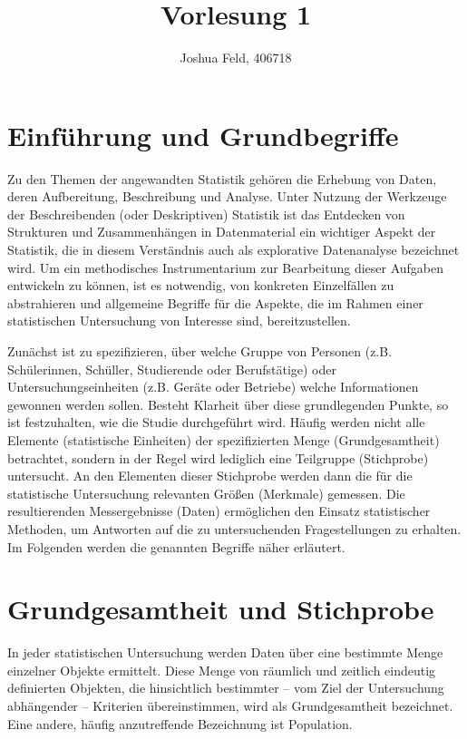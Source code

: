 \documentclass{lecture}
\institute{Institut für Statistik und Wirtschaftsmathematik}
\title{Vorlesung 1}
\author{Joshua Feld, 406718}
\begin{document}
    \maketitle


    \section*{Einführung und Grundbegriffe}

    Zu den Themen der angewandten Statistik gehören die Erhebung von Daten, deren Aufbereitung, Beschreibung und Analyse.
    Unter Nutzung der Werkzeuge der Beschreibenden (oder Deskriptiven) Statistik ist das Entdecken von Strukturen und Zusammenhängen in Datenmaterial ein wichtiger Aspekt der Statistik, die in diesem Verständnis auch als explorative Datenanalyse bezeichnet wird.
    Um ein methodisches Instrumentarium zur Bearbeitung dieser Aufgaben entwickeln zu können, ist es notwendig, von konkreten Einzelfällen zu abstrahieren und allgemeine Begriffe für die Aspekte, die im Rahmen einer statistischen Untersuchung von Interesse sind, bereitzustellen.

    Zunächst ist zu spezifizieren, über welche Gruppe von Personen (z.B. Schülerinnen, Schüller, Studierende oder Berufstätige) oder Untersuchungseinheiten (z.B. Geräte oder Betriebe) welche Informationen gewonnen werden sollen.
    Besteht Klarheit über diese grundlegenden Punkte, so ist festzuhalten, wie die Studie durchgeführt wird.
    Häufig werden nicht alle Elemente (statistische Einheiten) der spezifizierten Menge (Grundgesamtheit) betrachtet, sondern in der Regel wird lediglich eine Teilgruppe (Stichprobe) untersucht.
    An den Elementen dieser Stichprobe werden dann die für die statistische Untersuchung relevanten Größen (Merkmale) gemessen.
    Die resultierenden Messergebnisse (Daten) ermöglichen den Einsatz statistischer Methoden, um Antworten auf die zu untersuchenden Fragestellungen zu erhalten.
    Im Folgenden werden die genannten Begriffe näher erläutert.


    \section*{Grundgesamtheit und Stichprobe}

    In jeder statistischen Untersuchung werden Daten über eine bestimmte Menge einzelner Objekte ermittelt.
    Diese Menge von räumlich und zeitlich eindeutig definierten Objekten, die hinsichtlich bestimmter -- vom Ziel der Untersuchung abhängender -- Kriterien übereinstimmen, wird als Grundgesamtheit bezeichnet.
    Eine andere, häufig anzutreffende Bezeichnung ist Population.
\end{document}
